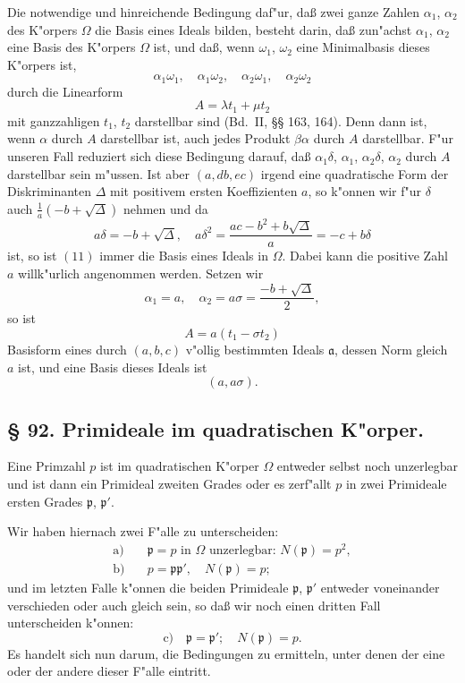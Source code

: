\documentclass[12pt,a4paper]{article}
\theoremstyle{plain}
\begin{document}
Die notwendige und hinreichende Bedingung daf"ur, da\ss{} zwei ganze Zahlen $\alpha_1$, $\alpha_2$ des K"orpers $\Omega$ die Basis eines Ideals bilden, besteht darin, da\ss{} zun"achst $\alpha_1$, $\alpha_2$ eine Basis des K"orpers $\Omega$ ist, und da\ss{}, wenn $\omega_1$, $\omega_2$ eine Minimalbasis dieses K"orpers ist,
\[
\alpha_1\omega_1,\quad \alpha_1\omega_2,\quad \alpha_2\omega_1,\quad \alpha_2\omega_2
\]
durch die Linearform
\[
A = \lambda t_1 + \mu t_2
\]
mit ganzzahligen $t_1$, $t_2$ darstellbar sind (Bd.~II, \S\S{} 163, 164). Denn dann ist, wenn $\alpha$ durch $A$ darstellbar ist, auch jedes Produkt $\beta\alpha$ durch $A$ darstellbar. F"ur unseren Fall reduziert sich diese Bedingung darauf, da\ss{} $\alpha_1\delta$, $\alpha_1$, $\alpha_2\delta$, $\alpha_2$ durch $A$ darstellbar sein m"ussen. Ist aber $(a, db, ec)$ irgend eine quadratische Form der Diskriminanten $\Delta$ mit positivem ersten Koeffizienten $a$, so k"onnen wir f"ur $\delta$ auch $\frac{1}{a}(-b + \sqrt{\Delta})$ nehmen und da
\[
a\delta = -b + \sqrt{\Delta},\quad a\delta^2 = \frac{ac - b^2 + b\sqrt{\Delta}}{a} = -c + b\delta
\]
ist, so ist $(11)$ immer die Basis eines Ideals in $\Omega$. Dabei kann die positive Zahl $a$ willk"urlich angenommen werden. Setzen wir
\begin{equation}
\alpha_1 = a,\quad \alpha_2 = a\sigma = \frac{-b + \sqrt{\Delta}}{2},
\tag{15}
\end{equation}
so ist
\begin{equation}
A = a(t_1 - \sigma t_2)
\tag{16}
\end{equation}
Basisform eines durch $(a, b, c)$ v"ollig bestimmten Ideals $\mathfrak{a}$, dessen Norm gleich $a$ ist, und eine Basis dieses Ideals ist
\begin{equation}
(a, a\sigma).
\tag{17}
\end{equation}

\subsection*{\S{} 92. Primideale im quadratischen K"orper.}

Eine Primzahl $p$ ist im quadratischen K"orper $\Omega$ entweder selbst noch unzerlegbar und ist dann ein Primideal zweiten Grades oder es zerf"allt $p$ in zwei Primideale ersten Grades $\mathfrak{p}$, $\mathfrak{p}'$.

Wir haben hiernach zwei F"alle zu unterscheiden:
\begin{align*}
\text{a)}\quad & \mathfrak{p} = p \text{ in } \Omega \text{ unzerlegbar: } N(\mathfrak{p}) = p^2,\\
\text{b)}\quad & p = \mathfrak{p}\mathfrak{p}',\quad N(\mathfrak{p}) = p;
\end{align*}
und im letzten Falle k"onnen die beiden Primideale $\mathfrak{p}$, $\mathfrak{p}'$ entweder voneinander verschieden oder auch gleich sein, so da\ss{} wir noch einen dritten Fall unterscheiden k"onnen:
\[
\text{c)}\quad \mathfrak{p} = \mathfrak{p}';\quad N(\mathfrak{p}) = p.
\]
Es handelt sich nun darum, die Bedingungen zu ermitteln, unter denen der eine oder der andere dieser F"alle eintritt.
\end{document}
